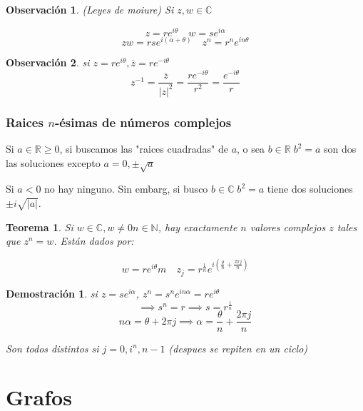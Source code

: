 \documentclass[9pt,a4paper,draft]{article}
\theoremstyle{definition}
\theoremstyle{plain}
\newtheorem{teo}{Teorema}
\newtheorem{demo}{Demostración}[teo]
\newtheorem{obs}{Observación}
\begin{document}
\begin{obs} (Leyes de moiure) Si $z,w\in{\mathbb{C}}$

$$ z=re^{i\theta} \quad w = se^{i\alpha} $$
$$ zw = rse^{i(\alpha+\theta)} \quad z^n = r^n e^{in\theta} $$
\end{obs}

\begin{obs}
si $z=re^{i\theta}, \overline{z}=re^{-i\theta}$
$$ z^{-1} = \frac{\overline{z}}{|z|^2} = \frac{re^{-i\theta}}{r^2} = \frac{e^{-i\theta}}{r}$$
\end{obs}

\section{Raices $n$-ésimas de números complejos}

Si $a\in{\mathbb{R}}\geq{0}$, si buscamos las "raices cuadradas" de $a$, o sea $b\in{\mathbb{R}}\; b^2=a$ son dos las soluciones excepto $a=0, \pm\sqrt{a}$

Si $a<0$ no hay ninguno. Sin embarg, si busco $b\in{\mathbb{C}}\; b^2=a$ tiene dos soluciones $\pm i\sqrt{|a|}$.

\begin{teo} Si $w\in{\mathbb{C}}, w\neq{0} n\in{\mathbb{N}}$, hay exactamente $n$ valores complejos $z$ tales que $z^n = w$. Están dados por:

$$ w=re^{i\theta}m \quad z_j=r^{\frac{1}{n}}e^{i\left(\frac{\theta}{n} + \frac{2\pi j}{n}\right)}$$
\end{teo}

\begin{demo}
si $z=se^{i\alpha}$, $z^n=s^ne^{in\alpha}=re^{i\theta}$
$$\implies s^n = r \implies s=r^{\frac{1}{n}}$$
$$ n\alpha = \theta + 2\pi j \implies \alpha = \frac{\theta}{n} + \frac{2\pi j}{n}$$

Son todos distintos si $j=0, i^n, n-1$ (despues se repiten en un ciclo)
\end{demo}

\part{Grafos}
\end{document}
